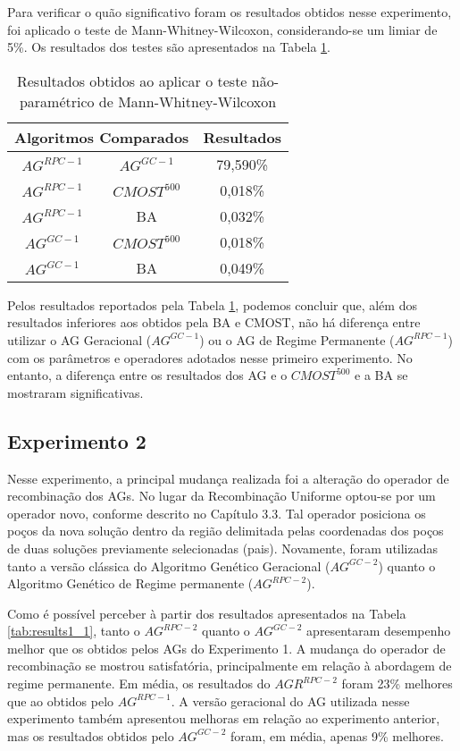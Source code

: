 Para verificar o quão significativo foram os resultados obtidos nesse experimento, foi aplicado o teste de Mann-Whitney-Wilcoxon, considerando-se um limiar de 5\%. Os resultados dos testes são apresentados na Tabela \ref{tab:mw1_1}.

\begin{table}[H]
\centering
\caption{Resultados obtidos ao aplicar o teste não-paramétrico de Mann-Whitney-Wilcoxon}
\label{tab:mw1_1}
\begin{tabular}{|c|c|c|}
\hline
\multicolumn{2}{|c|}{Algoritmos Comparados} & Resultados \\ \hline
$AG^{RPC-1}$ &	$AG^{GC-1}$ & 79,590\% \\ \hline
$AG^{RPC-1}$ & $CMOST^{500}$ & 0,018\% \\ \hline
$AG^{RPC-1}$ & BA & 0,032\% \\ \hline
$AG^{GC-1}$ & $CMOST^{500}$ & 0,018\% \\ \hline
$AG^{GC-1}$ & BA & 0,049\% \\ \hline

\end{tabular}
\end{table}

Pelos resultados reportados pela Tabela \ref{tab:mw1_1}, podemos concluir que, além dos resultados inferiores aos obtidos pela BA e CMOST, não há diferença entre utilizar o AG Geracional ($AG^{GC-1}$) ou o AG de Regime Permanente ($AG^{RPC-1}$) com os parâmetros e operadores adotados nesse primeiro experimento. No entanto, a diferença entre os resultados dos AG e o $CMOST^{500}$ e a BA se mostraram  significativas.

\subsection{Experimento 2}
\label{ch:5_Experimento2}
Nesse experimento, a principal mudança realizada foi a alteração do operador de recombinação dos AGs. No lugar da Recombinação Uniforme optou-se por um operador novo, conforme descrito no Capítulo 3.3. Tal operador posiciona os poços da nova solução dentro da região delimitada pelas coordenadas dos poços de duas soluções previamente selecionadas (pais). Novamente, foram utilizadas tanto a versão clássica do Algoritmo Genético Geracional ($AG^{GC-2}$) quanto o Algoritmo Genético de Regime permanente ($AG^{RPC-2}$).

Como é possível perceber à partir dos resultados apresentados na Tabela \ref{tab:results1_1}, tanto o $AG^{RPC-2}$ quanto o $AG^{GC-2}$ apresentaram desempenho melhor que os obtidos pelos AGs do Experimento 1. A mudança do operador de recombinação se mostrou satisfatória, principalmente em relação à abordagem de regime permanente. Em média, os resultados do $AGR^{RPC-2}$ foram 23\% melhores que ao obtidos pelo $AG^{RPC-1}$. A versão geracional do AG utilizada nesse experimento também apresentou melhoras em relação ao experimento anterior, mas os resultados obtidos pelo $AG^{GC-2}$ foram, em média, apenas 9\% melhores.

